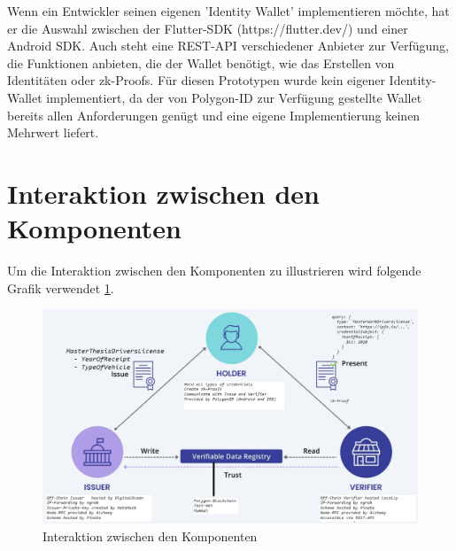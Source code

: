 Wenn ein Entwickler seinen eigenen 'Identity Wallet' implementieren möchte, hat er die Auswahl zwischen der Flutter-SDK (https://flutter.dev/) und einer Android SDK. Auch steht eine REST-API verschiedener Anbieter zur Verfügung, die Funktionen anbieten, die der Wallet benötigt, wie das Erstellen von Identitäten oder zk-Proofs.
Für diesen Prototypen wurde kein eigener Identity-Wallet implementiert, da der von Polygon-ID zur Verfügung gestellte Wallet bereits allen Anforderungen genügt und eine eigene Implementierung keinen Mehrwert liefert.

\section{Interaktion zwischen den Komponenten}
Um die Interaktion zwischen den Komponenten zu illustrieren wird folgende Grafik verwendet \ref{fig:trust}.

\begin{figure}[H]
	\centering
	\includegraphics[scale=0.4]{media/trust}
	\caption{Interaktion zwischen den Komponenten \cite{ID63}}
	\label{fig:trust}
\end{figure}

